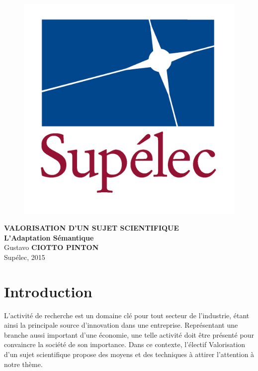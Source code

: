 \documentclass{article}
\begin{document}
\begin{titlepage}
\vspace*{.28\textheight}
\begin{center}
%
\begin{figure}[h]
    \centering
    \includegraphics[scale=0.12]{images/LogoSupelec}
\end{figure}
\vspace*{10pt}
\textbf{\LARGE{VALORISATION D'UN SUJET SCIENTIFIQUE}}\\[1 cm]
\textbf{\LARGE{\og L'Adaptation Sémantique \fg}}\\[2 cm]
Gustavo \textbf{CIOTTO PINTON}\\[1 cm]
Supélec, 2015

\end{center}
\end{titlepage}

\newpage

\section{Introduction}

L'activité de recherche est un domaine clé pour tout secteur de l'industrie, 
étant ainsi la principale source d'innovation dans une entreprise. Représentant
une branche aussi important d'une économie, une telle activité doit être
présenté pour convaincre la société de son importance. Dans ce contexte,
l'électif \og Valorisation d'un sujet scientifique \fg propose des moyens et
des techniques à attirer l'attention à notre thème. 
\end{document}
